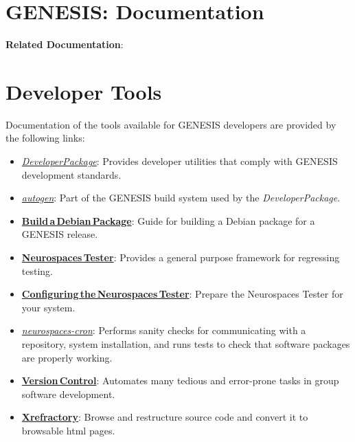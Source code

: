 \documentclass[12pt]{article}
\begin{document}
\section*{GENESIS: Documentation}

{\bf Related Documentation}:

\section*{Developer Tools}

Documentation of the tools available for GENESIS developers are provided by the following links:

\begin{itemize}
   \item[]\href{../developer-package/developer-package.tex}{\it DeveloperPackage}: Provides developer utilities that comply with GENESIS development standards.
   \item[]\href{../autogen/autogen.tex}{\it autogen}: Part of the GENESIS build system used by the {\it DeveloperPackage}.
   \item[]\href{../build-debian/build-debian.tex}{\bf Build\,a\,Debian\,Package}: Guide for building a Debian package for a GENESIS release.
   \item[]\href{../neurospaces-tester/neurospaces-tester.tex}{\bf Neurospaces\,Tester}: Provides a general purpose framework for regressing testing. 
   \item[]\href{../tester-configuration/tester-configuration.tex}{\bf Configuring\,the\,Neurospaces\,Tester}: Prepare the Neurospaces Tester for your system.
   \item[]\href{../neurospaces-cron/neurospaces-cron.tex}{\it neurospaces-cron}: Performs sanity checks for communicating with a repository, system installation, and runs tests to check that software packages are properly working.
   \item[]\href{../version-control/version-control.tex}{\bf Version\,Control}: Automates many tedious and error-prone tasks in group software development.
   \item[]\href{../cxref/cxref.tex}{\bf Xrefractory}: Browse and restructure source code and convert it to browsable html pages. 

\end{itemize}
\end{document}
